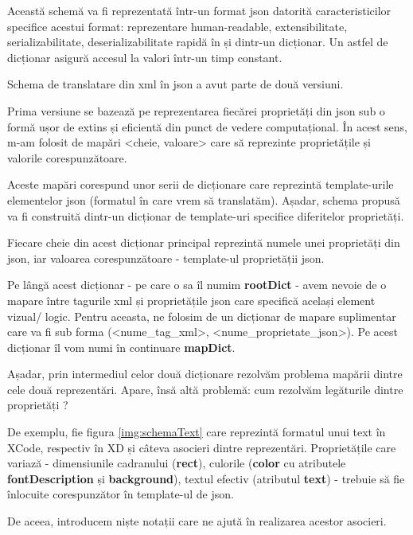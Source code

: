 Această schemă va fi reprezentată într-un format json datorită caracteristicilor specifice acestui format: reprezentare human-readable, extensibilitate, serializabilitate, deserializabilitate rapidă în și dintr-un dicționar. Un astfel de dicționar asigură accesul la valori într-un timp constant.

Schema de translatare din xml în json a avut parte de două versiuni. 

Prima versiune se bazează pe reprezentarea fiecărei proprietăți din json sub o formă ușor de extins și eficientă din punct de vedere computațional. În acest sens, m-am folosit de mapări <cheie, valoare> care să reprezinte proprietățile și valorile corespunzătoare.

Aceste mapări corespund unor serii de dicționare care reprezintă template-urile elementelor json (formatul în care vrem să translatăm). Așadar, schema propusă va fi construită dintr-un dicționar de template-uri specifice diferitelor proprietăți. 

Fiecare cheie din acest dicționar principal reprezintă numele unei proprietăți din json, iar valoarea corespunzătoare - template-ul proprietății json. 

Pe lângă acest dicționar - pe care o sa îl numim \textbf{rootDict} - avem nevoie de o mapare între tagurile xml și proprietățile json care specifică același element vizual/ logic. Pentru aceasta, ne folosim de un dicționar de mapare suplimentar care va fi sub forma (<nume_tag_xml>,  <nume_proprietate_json>). Pe acest dicționar îl vom numi în continuare \textbf{mapDict}.

Așadar, prin intermediul celor două dicționare rezolvăm problema mapării dintre cele două reprezentări. Apare, însă altă problemă: cum rezolvăm legăturile dintre proprietăți ?





De exemplu, fie figura \ref{img:schemaText} care reprezintă formatul unui text în XCode, respectiv în XD și câteva asocieri dintre reprezentări.
Proprietățile care variază - dimensiunile cadranului (\textbf{rect}), culorile (\textbf{color} cu atributele \textbf{fontDescription} și \textbf{background}), textul efectiv (atributul \textbf{text}) - trebuie să fie înlocuite corespunzător în template-ul de json.


De aceea, introducem niște notații care ne ajută în realizarea acestor asocieri. 


